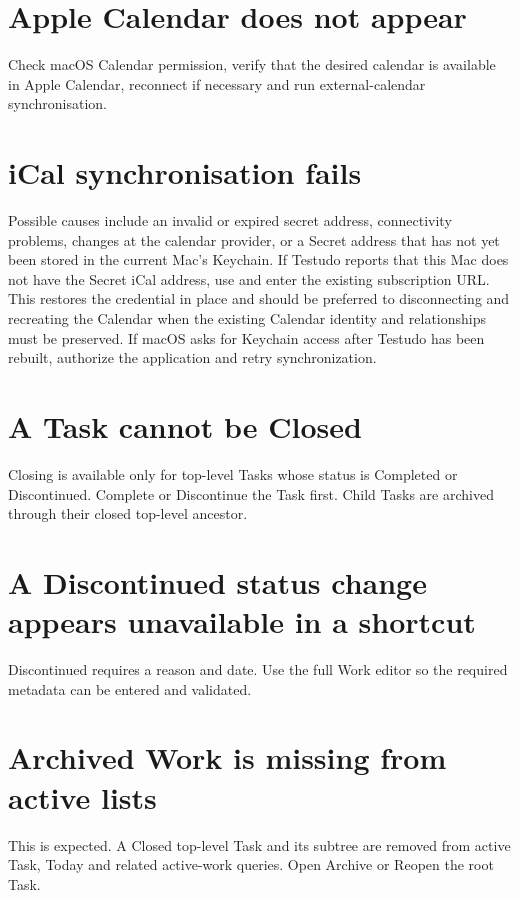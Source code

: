 \documentclass{testudomanual}
\begin{document}
\section{Apple Calendar does not appear}

Check macOS Calendar permission, verify that the desired calendar is available in Apple Calendar, reconnect if necessary and run external-calendar synchronisation.

\section{iCal synchronisation fails}

Possible causes include an invalid or expired secret address, connectivity problems, changes at the calendar provider, or a Secret address that has not yet been stored in the current Mac's Keychain. If Testudo reports that this Mac does not have the Secret iCal address, use  and enter the existing subscription URL. This restores the credential in place and should be preferred to disconnecting and recreating the Calendar when the existing Calendar identity and relationships must be preserved. If macOS asks for Keychain access after Testudo has been rebuilt, authorize the application and retry synchronization.

\section{A Task cannot be Closed}

Closing is available only for top-level Tasks whose status is Completed or Discontinued. Complete or Discontinue the Task first. Child Tasks are archived through their closed top-level ancestor.

\section{A Discontinued status change appears unavailable in a shortcut}

Discontinued requires a reason and date. Use the full Work editor so the required metadata can be entered and validated.

\section{Archived Work is missing from active lists}

This is expected. A Closed top-level Task and its subtree are removed from active Task, Today and related active-work queries. Open Archive or Reopen the root Task.
\end{document}
